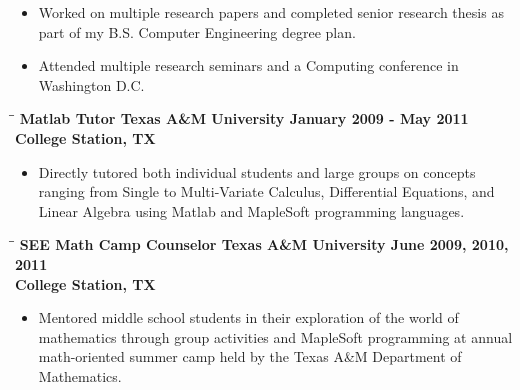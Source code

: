 \documentclass[8pt]{res}
\begin{document}
\begin{resume}
\begin{itemize}
      \item Worked on multiple research papers and completed senior research thesis as part of my B.S. Computer Engineering degree plan.
      \item Attended multiple research seminars and a Computing conference in Washington D.C.
    \end{itemize}\vspace{-18pt}      %
    \begin{tabbing}
      \hspace{2.3in}\= \hspace{2.6in}\= \kill %
      \bf Matlab Tutor \>\bf Texas A\&M University \>\bf January 2009 - May 2011\\ \>\bf College Station, TX
    \end{tabbing}\vspace{-10pt}      %
    \begin{itemize}
      \item Directly tutored both individual students and large groups on concepts ranging from Single to Multi-Variate Calculus, Differential Equations, and Linear Algebra using Matlab and MapleSoft programming languages.
    \end{itemize}\vspace{-18pt}      %
    \begin{tabbing}
      \hspace{2.3in}\= \hspace{2.6in}\= \kill %
      \bf SEE Math Camp Counselor \>\bf Texas A\&M University \>\bf June 2009, 2010, 2011\\ \>\bf College Station, TX
    \end{tabbing}\vspace{-10pt}      %
    \begin{itemize}
      \item Mentored middle school students in their exploration of the world of mathematics through group activities and MapleSoft programming at annual math-oriented summer camp held by the Texas A\&M Department of Mathematics.
    \end{itemize}


\end{resume}
\end{document}

